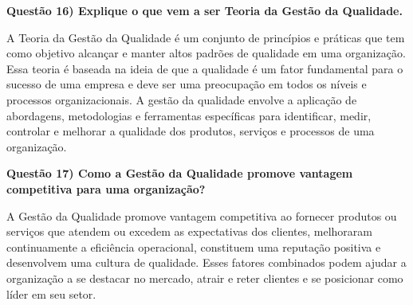 \documentclass[11pt]{article}
\begin{document}
\noindent \textbf{Questão 16) Explique o que vem a ser Teoria da Gestão da Qualidade.}\par
A Teoria da Gestão da Qualidade é um conjunto de princípios e práticas que tem como objetivo alcançar e manter altos padrões de qualidade em uma organização. Essa teoria é baseada na ideia de que a qualidade é um fator fundamental para o sucesso de uma empresa e deve ser uma preocupação em todos os níveis e processos organizacionais. A gestão da qualidade envolve a aplicação de abordagens, metodologias e ferramentas específicas para identificar, medir, controlar e melhorar a qualidade dos produtos, serviços e processos de uma organização.\par

\noindent \textbf{Questão 17) Como a Gestão da Qualidade promove vantagem competitiva para uma organização?}\par
A Gestão da Qualidade promove vantagem competitiva ao fornecer produtos ou serviços que atendem ou excedem as expectativas dos clientes, melhoraram continuamente a eficiência operacional, constituem uma reputação positiva e desenvolvem uma cultura de qualidade. Esses fatores combinados podem ajudar a organização a se destacar no mercado, atrair e reter clientes e se posicionar como líder em seu setor.
\end{document}
